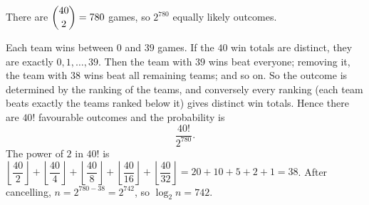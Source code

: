 There are $\dbinom{40}{2}=780$ games, so $2^{780}$ equally likely outcomes.

Each team wins between $0$ and $39$ games. If the $40$ win totals are distinct, they are exactly $0,1,\dots,39$. Then the team with $39$ wins beat everyone; removing it, the team with $38$ wins beat all remaining teams; and so on. So the outcome is determined by the ranking of the teams, and conversely every ranking (each team beats exactly the teams ranked below it) gives distinct win totals. Hence there are $40!$ favourable outcomes and the probability is
\[
\dfrac{40!}{2^{780}}.
\]
The power of $2$ in $40!$ is $\left\lfloor\dfrac{40}{2}\right\rfloor+\left\lfloor\dfrac{40}{4}\right\rfloor+\left\lfloor\dfrac{40}{8}\right\rfloor+\left\lfloor\dfrac{40}{16}\right\rfloor+\left\lfloor\dfrac{40}{32}\right\rfloor=20+10+5+2+1=38$. After cancelling, $n=2^{780-38}=2^{742}$, so $\log_2n=\boxed{742}$.
